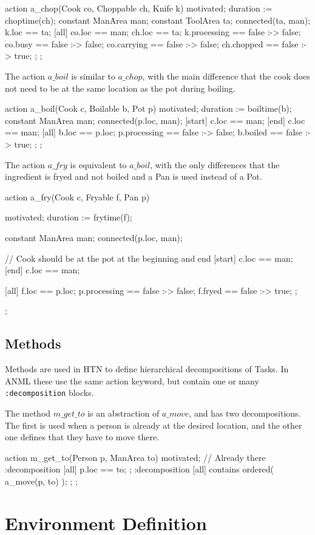 \begin{anmlcode}
action a_chop(Cook co, Choppable ch, Knife k) {
  motivated;
  duration := choptime(ch);
  constant ManArea man;
  constant ToolArea ta;
  connected(ta, man);
  k.loc == ta;
  [all] {
    co.loc == man;
    ch.loc == ta;
    k.processing == false :-> false;
    co.busy == false :-> false;
    co.carrying == false :-> false;
    ch.chopped == false :-> true;
  };
};
\end{anmlcode}

The action $a\_boil$ is similar to $a\_chop$, with the main difference that the cook does not need to be at the same location as the pot during boiling.

\begin{anmlcode}
action a_boil(Cook c, Boilable b, Pot p) {
  motivated;
  duration := boiltime(b);
  constant ManArea man;
  connected(p.loc, man);
  [start] c.loc == man;
  [end] c.loc == man;
  [all] {
    b.loc == p.loc;
    p.processing == false :-> false;
    b.boiled == false :-> true;
  };
};
\end{anmlcode}

The action $a\_fry$ is equivalent to $a\_boil$, with the only differences that the ingredient is fryed and not boiled and a Pan is used instead of a Pot.

\begin{anmlcode}
action a_fry(Cook c, Fryable f, Pan p) {
  motivated;
  duration := frytime(f);

  constant ManArea man;
  connected(p.loc, man);

  // Cook should be at the pot at the beginning and end
  [start] c.loc == man;
  [end] c.loc == man;

  [all] {
    f.loc == p.loc;
    p.processing == false :-> false;
    f.fryed == false :-> true;
  };
};
\end{anmlcode}

\subsection{Methods}

Methods are used in HTN to define hierarchical decompositions of Tasks.
In ANML these use the same action keyword, but contain one or many \verb|:decomposition| blocks.

The method $m\_get\_to$ is an abstraction of $a\_move$, and has two decompositions.
The first is used when a person is already at the desired location, and the other one defines that they have to move there.

\begin{anmlcode}
action m_get_to(Person p, ManArea to) {
  motivated;
  // Already there
  :decomposition {
    [all] p.loc == to;
  };
  :decomposition {
    [all] contains ordered(
      a_move(p, to)
    );
  };
};
\end{anmlcode}

\section{Environment Definition}
\label{app:environments}

